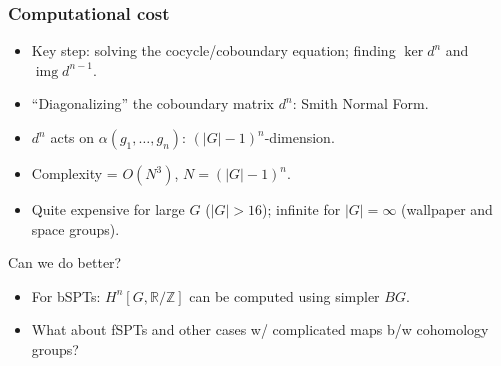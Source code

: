 \documentclass[xcolor=table, aspectratio=169]{beamer}
\newcommand{\uone}{\mathbb R/\mathbb Z}
\DeclareMathOperator{\img}{img}
\begin{document}
\begin{frame}
	\frametitle{Computational cost}
	\begin{itemize}
		\item Key step: solving the cocycle/coboundary equation; finding $\ker d^n$ and $\img d^{n-1}$.
		\item ``Diagonalizing'' the coboundary matrix $d^n$: Smith Normal Form.
		\item $d^n$ acts on $\alpha(g_1,\ldots,g_n)$: $(|G|-1)^n$-dimension.
		\item Complexity = $O(N^3)$, $N = (|G|-1)^n$.
		\item Quite expensive for large $G$ ($|G| > 16$); infinite for $|G|=\infty$ (wallpaper and space groups).
	\end{itemize}
	\begin{block}{Can we do better?}
		\begin{itemize}
			\item For bSPTs: $H^n[G,\uone]$ can be computed using simpler $BG$.
			\item What about fSPTs and other cases w/ complicated maps b/w cohomology groups?
		\end{itemize}
	\end{block}
\end{frame}
\end{document}
